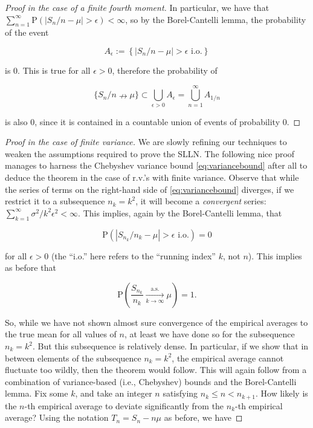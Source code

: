 \begin{proof}[Proof in the case of a finite fourth moment]
\noindent In particular, we have that
$\sum_{n=1}^\infty \mathrm{P}(|S_n/n-\mu|>\epsilon)
<\infty$,
so by the Borel-Cantelli lemma, the probability of the
event

\[
A_\epsilon := \left\{|S_n/n-\mu|>\epsilon \textrm{ i.o.}\right\}
\]

\noindent is $0$. This is true for all $\epsilon>0$, therefore
the probability of

\[
\{S_n/n\nrightarrow \mu\} \subset \bigcup_{\epsilon>0} A_\epsilon = \bigcup_{n=1}^\infty A_{1/n}
\]

\noindent is also $0$, since it is contained in a countable
union of events of probability 0.
\end{proof}

\begin{proof}[Proof in the case of finite variance]
We are slowly refining our techniques to weaken the
assumptions required to prove the SLLN. The following
nice proof manages to harness the Chebyshev variance
bound \eqref{eq:variancebound} after all to deduce the
theorem in the case of r.v.'s with finite variance.
Observe that while the series of terms on the
right-hand side of \eqref{eq:variancebound} diverges, if
we restrict it to a subsequence $n_k = k^2$, it will
become a \emph{convergent} series:
$\sum_{k=1}^\infty \sigma^2/k^2\epsilon^2<\infty$.
This implies, again by the Borel-Cantelli lemma, that

\[
\mathrm{P}(|S_{n_k}/{n_k} - \mu| > \epsilon \textrm{ i.o.}) = 0
\]

\noindent for all $\epsilon>0$ (the ``i.o.'' here refers to the
``running index'' $k$, not $n$). This implies as
before that

\[
\mathrm{P}\left(\frac{S_{n_k}}{n_k}\xrightarrow[k\to\infty]{\textrm{a.s.}} \mu\right) = 1.
\]

\noindent So, while we have not shown almost sure convergence
of the empirical averages to the true mean for all
values of $n$, at least we have done so for the
subsequence $n_k=k^2$. But this subsequence is
relatively dense. In particular, if we show that in
between elements of the subsequence $n_k=k^2$, the
empirical average cannot fluctuate too wildly, then
the theorem would follow. This will again follow from
a combination of variance-based (i.e., Chebyshev)
bounds and the Borel-Cantelli lemma. Fix some $k$,
and take an integer $n$ satisfying
$n_k\le n < n_{k+1}$. How likely is the $n$-th
empirical average to deviate significantly from the
$n_k$-th empirical average? Using the notation
$T_n=S_n-n\mu$ as before, we have


\end{proof}
